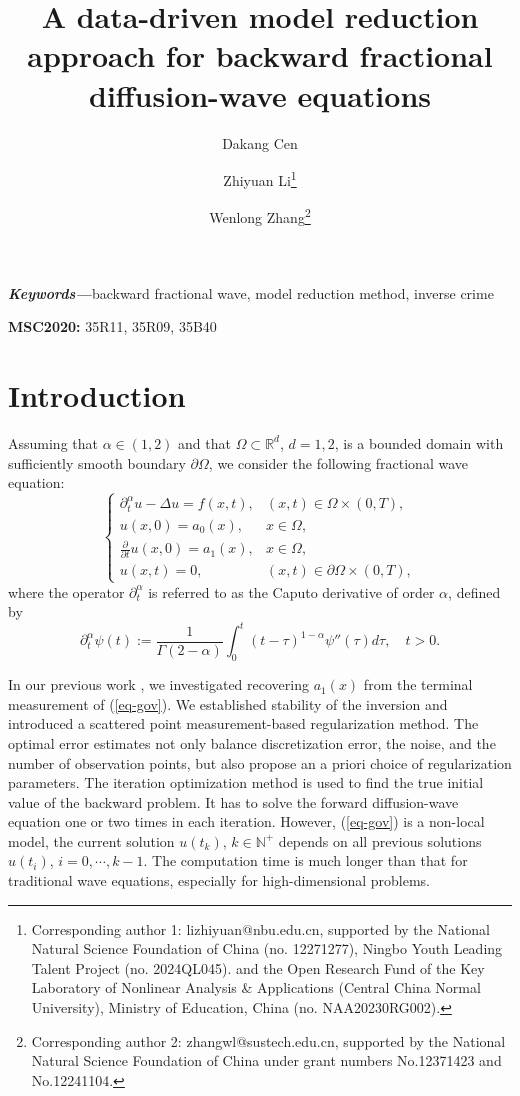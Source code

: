 \documentclass[11pt]{article}
\title{A data-driven model reduction approach for backward fractional diffusion-wave equations}
\author[1]{Dakang Cen}
\author[2]{Zhiyuan Li\footnote{Corresponding author 1: lizhiyuan@nbu.edu.cn, supported by the National Natural Science Foundation of China (no. 12271277), Ningbo Youth Leading Talent Project (no. 2024QL045).  and the Open Research Fund of the Key Laboratory of Nonlinear Analysis \& Applications (Central China Normal University), Ministry of Education, China (no. NAA20230RG002).}}
\author[3]{Wenlong Zhang\footnote{Corresponding author 2: zhangwl@sustech.edu.cn, supported by the National Natural Science Foundation of China under grant
numbers No.12371423 and No.12241104.}}
\affil[1,3]{Department of Mathematics, Southern University of Science and Technology, Shenzhen, 518055, China}
\affil[2]{School of Mathematics and Statistics, Ningbo University, Ningbo, 315211, China}
\numberwithin{equation}{section}
\newcommand{\keywords}[1]{\small\textbf{\textit{Keywords---}}#1}
\begin{document}
\maketitle


\keywords{backward fractional wave, model reduction method, inverse crime}

\textbf{MSC2020:} 35R11, 35R09, 35B40

\section{Introduction}
Assuming that $\alpha\in(1,2)$ and that $\Omega \subset \mathbb{R}^d$, $d=1,2$, is a bounded domain with sufficiently smooth boundary $\partial \Omega$, we consider the following fractional wave equation:
\begin{equation}\label{eq-gov}
\begin{cases}
  \partial_t^\alpha u - \Delta u = f(x,t), & (x,t) \in \Omega \times (0,T), \\
  u(x,0) = a_0(x), & x \in \Omega, \\
  \frac{\partial}{\partial t}u(x,0) = a_1(x), & x \in \Omega, \\
  u(x,t) = 0, & (x,t) \in \partial \Omega \times (0,T),
\end{cases}
\end{equation}
where the operator $\partial_t^\alpha$ is referred to as the Caputo derivative of order $\alpha$, defined by
$$
\partial_t^\alpha \psi(t) := \frac{1}{\Gamma(2 - \alpha)} \int_0^t (t-\tau)^{1-\alpha} \psi''(\tau) d\tau, \quad t>0.
$$

In our previous work \cite{LiZhang2025,LiZhang2024}, we investigated recovering $a_1(x)$ from the terminal measurement of (\ref{eq-gov}). We established stability of the inversion and introduced a scattered point measurement-based regularization method. The optimal error estimates not only balance discretization error, the noise, and the number of observation points, but also propose an a priori choice of regularization parameters. The iteration optimization method is used to find the true initial value of the backward problem. It has to solve the forward diffusion-wave equation one or two times in each iteration. However, (\ref{eq-gov}) is a non-local model, the current solution $u(t_k)$, $k\in\mathbb{N}^+$ depends on all previous solutions $u(t_i)$, $i=0,\cdots,k-1$. The computation time is much longer than that for traditional wave equations, especially for high-dimensional problems.
\end{document}
